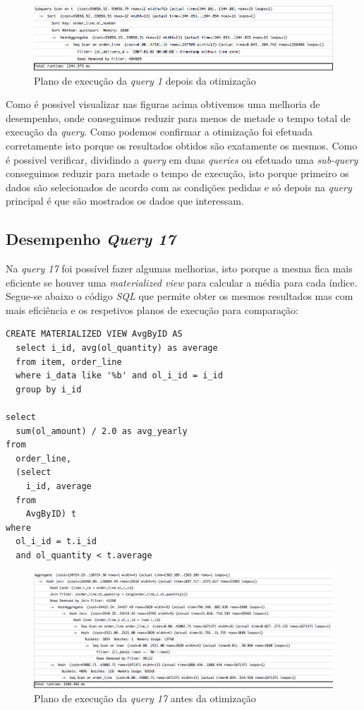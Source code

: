 \begin{figure}[ht!]
\centering
\includegraphics[width=\textwidth]{img/00_query1_ant}
\caption{Plano de execução da \textit{query 1} depois da otimização \label{overflow}}
\end{figure}

Como é possivel visualizar nas figuras acima obtivemos uma melhoria de desempenho, onde conseguimos reduzir para menos de metade o tempo total de execução da \textit{query}. Como podemos confirmar a otimização foi efetuada corretamente isto porque os resultados obtidos são exatamente os mesmos. Como é possivel verificar, dividindo a \textit{query} em duas \textit{queries} ou efetuado uma \textit{sub-query} conseguimos reduzir para metade o tempo de execução, isto porque primeiro os dados são selecionados de acordo com as condições pedidas e só depois na \textit{query} principal é que são mostrados os dados que interessam.

\newpage

\subsection{Desempenho \textit{Query 17}}

Na \textit{query 17} foi possível fazer algumas melhorias, isto porque a mesma fica mais eficiente se houver uma \textit{materialized view} para calcular a média para cada índice. Segue-se abaixo o código \textit{SQL} que permite obter os mesmos resultados mas com mais eficiência e os respetivos planos de execução para comparação:

\begin{verbatim}
CREATE MATERIALIZED VIEW AvgByID AS
  select i_id, avg(ol_quantity) as average
  from item, order_line
  where i_data like '%b' and ol_i_id = i_id
  group by i_id

select
  sum(ol_amount) / 2.0 as avg_yearly
from
  order_line,
  (select
    i_id, average
  from
    AvgByID) t
where
  ol_i_id = t.i_id
  and ol_quantity < t.average
\end{verbatim}

\begin{figure}[ht!]
\centering
\includegraphics[width=\textwidth]{img/00_query17_ant}
\caption{Plano de execução da \textit{query 17} antes da otimização \label{overflow}}
\end{figure}

